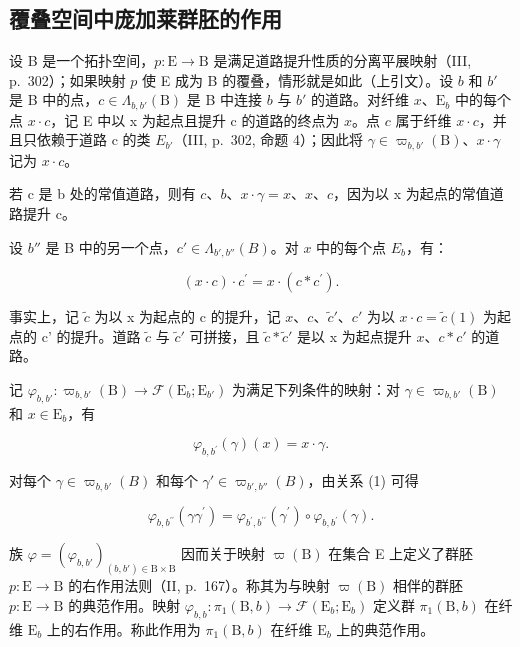 \subsection{覆叠空间中庞加莱群胚的作用}

设 B 是一个拓扑空间，\(p \colon \mathrm{E} \to \mathrm{B}\) 是满足道路提升性质的分离平展映射（III, p.~302）；如果映射 \(p\) 使 E 成为 B 的覆叠，情形就是如此（上引文）。设 \(b\) 和 \(b'\) 是 B 中的点，\(c \in \Lambda_{b,b'}(\mathrm{B})\) 是 B 中连接 \(b\) 与 \(b'\) 的道路。对纤维 \(x\)、\(\mathrm{E}_b\) 中的每个点 \(x \cdot c\)，记 E 中以 x 为起点且提升 c 的道路的终点为 \(x\)。点 \(c\) 属于纤维 \(x \cdot c\)，并且只依赖于道路 c 的类 \(E_{b'}\)（III, p.~302, 命题 4）；因此将 \(\gamma \in \varpi_{b,b'}(\mathrm{B})\)、\(x \cdot \gamma\) 记为 \(x \cdot c\)。

若 c 是 b 处的常值道路，则有 \(c\)、\(b\)、\(x \cdot \gamma = x\)、\(x\)、\(c\)，因为以 x 为起点的常值道路提升 c。

设 \(b''\) 是 B 中的另一个点，\(c' \in \Lambda_{b',b''}(B)\)。对 \(x\) 中的每个点 \(E_b\)，有：

\[
(x \cdot c) \cdot c ^ {\prime} = x \cdot (c * c ^ {\prime}).\tag{1}
\]

事实上，记 \(\widetilde{c}\) 为以 x 为起点的 c 的提升，记 \(x\)、\(c\)、\(\widetilde{c}'\)、\(c'\) 为以 \(x \cdot c = \widetilde{c}(1)\) 为起点的 c' 的提升。道路 \(\widetilde{c}\) 与 \(\widetilde{c}'\) 可拼接，且 \(\widetilde{c} * \widetilde{c}'\) 是以 x 为起点提升 \(x\)、\(c * c'\) 的道路。

记 \(\varphi_{b,b'}\colon \varpi_{b,b'}(\mathrm{B})\to \mathcal{F}(\mathrm{E}_b;\mathrm{E}_{b'})\) 为满足下列条件的映射：对 \(\gamma \in \varpi_{b,b'}(\mathrm{B})\) 和 \(x\in \mathrm{E}_b\)，有

\[
\varphi_ {b, b ^ {\prime}} (\gamma) (x) = x \cdot \gamma .
\]

对每个 \(\gamma \in \varpi_{b,b'}(B)\) 和每个 \(\gamma' \in \varpi_{b',b''}(B)\)，由关系 (1) 可得

\[
\varphi_ {b, b ^ {\prime \prime}} (\gamma \gamma^ {\prime}) = \varphi_ {b ^ {\prime}, b ^ {\prime \prime}} (\gamma^ {\prime}) \circ \varphi_ {b, b ^ {\prime}} (\gamma).\tag{2}
\]

族 \(\varphi = (\varphi_{b,b'})_{(b,b')\in\mathrm{B}\times\mathrm{B}}\) 因而关于映射 \(\varpi(\mathrm{B})\) 在集合 E 上定义了群胚 \(p\colon\mathrm{E}\to\mathrm{B}\) 的右作用法则（II, p.~167）。称其为与映射 \(\varpi(\mathrm{B})\) 相伴的群胚 \(p\colon\mathrm{E}\to\mathrm{B}\) 的典范作用。映射 \(\varphi_{b,b}\colon\pi_{1}(\mathrm{B},b)\to\mathcal{F}(\mathrm{E}_{b};\mathrm{E}_{b})\) 定义群 \(\pi_{1}(\mathrm{B},b)\) 在纤维 \(\mathrm{E}_{b}\) 上的右作用。称此作用为 \(\pi_{1}(\mathrm{B},b)\) 在纤维 \(\mathrm{E}_{b}\) 上的典范作用。

